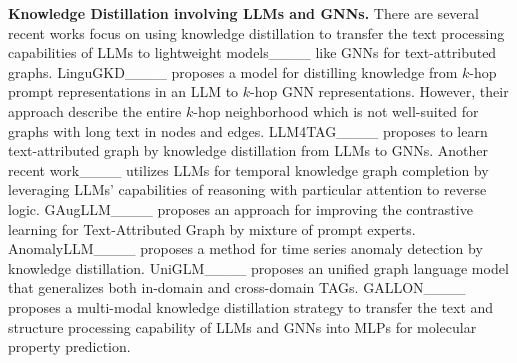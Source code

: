 \textbf{Knowledge Distillation involving LLMs and GNNs.} There are several recent works focus on using knowledge distillation to transfer the text processing capabilities of LLMs to lightweight models____ like GNNs for text-attributed graphs. 
LinguGKD____ proposes a model for distilling knowledge from $k$-hop prompt representations in an LLM to $k$-hop GNN representations. However, their approach describe the entire $k$-hop neighborhood which is not well-suited for graphs with long text in nodes and edges. 
LLM4TAG____ proposes to learn text-attributed graph by knowledge distillation from LLMs to GNNs. Another recent work____ utilizes LLMs for temporal knowledge graph completion by leveraging LLMs' capabilities of reasoning with particular attention to reverse logic.
GAugLLM____ proposes an approach for improving the contrastive learning for Text-Attributed Graph by mixture of prompt experts. AnomalyLLM____ proposes a method for time series anomaly detection by knowledge distillation. UniGLM____ proposes an unified graph language model that generalizes both in-domain and cross-domain TAGs. GALLON____ proposes a multi-modal knowledge distillation strategy to transfer the text and structure processing capability of LLMs and GNNs into MLPs for molecular property prediction.\\%
